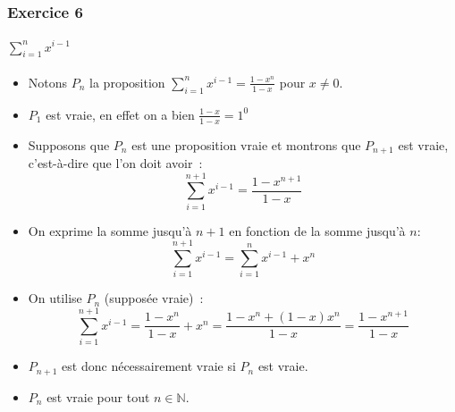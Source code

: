\documentclass[10pt,notheorems]{beamer}
\theoremstyle{plain}
\theoremstyle{definition} %
\begin{document}
\begin{frame}
  \frametitle{Exercice 6}
  \framesubtitle{$\sum_{i=1}^n x^{i-1}$}
  \fontsize{8}{10}\selectfont

  \begin{itemize}

  \item Notons $P_n$ la proposition $\sum_{i=1}^n x^{i-1} = \frac{1-x^n}{1-x}$ pour $x\neq 0$.\newline

  \item $P_1$ est vraie, en effet on a bien $\frac{1-x}{1-x} = 1^0$\newline

  \item Supposons que $P_n$ est une proposition vraie et montrons que $P_{n+1}$ est vraie, c'est-à-dire  que l'on doit avoir~:
    \[
      \sum_{i=1}^{n+1} x^{i-1} = \frac{1-x^{n+1}}{1-x}
    \]

  \item On exprime la somme jusqu'à $n+1$ en fonction de la somme jusqu'à $n$:
    \[
      \sum_{i=1}^{n+1} x^{i-1} = \sum_{i=1}^{n} x^{i-1} + x^n
    \]

  \item On utilise $P_n$ (supposée vraie)~:
    \[
        \sum_{i=1}^{n+1} x^{i-1} = \frac{1-x^n}{1-x} + x^n = \frac{1-x^n+(1-x)x^n}{1-x} = \frac{1-x^{n+1}}{1-x}
    \]

  \item $P_{n+1}$ est donc nécessairement vraie si $P_{n}$ est vraie.\newline

  \item $P_n$ est vraie pour tout $n\in\mathbb N$.
    
  \end{itemize}
  
\end{frame}
\end{document}
